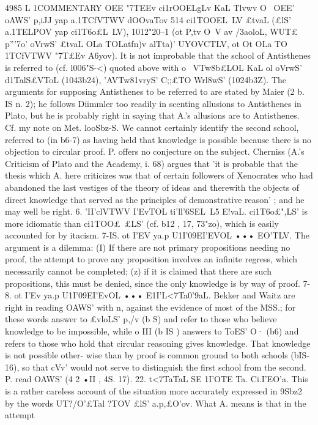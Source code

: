 {{4985
L 1COMMENTARY
OEE {"7TEEv ci1rOOELgLv KaL Tlvwv O~ OEE' oAWS' p,iJJ yap a.1TCfVTWV dOOvaTov
514
ci1TOOEL~LV £tvaL (£lS' a.1TELPOV yap
ci1T6o£L~LV), 1012"20--1 (ot P,tv O~V
av /3aol{oL, WUT£ p'''7o' oVrwS' £tvaL
OLa TOLatfn)v alTta)' UYOVCTLV, ot Ot
OLa TO 1TCfVTWV {"7T£Ev A6yov). It is not improbable that the school
of Antisthenes is referred to (cf. l006"S-<) quoted above with
o{ ~VTw8b£LOL KaL ol oVrwS' d1TalS£VToL (1043b24), 'AVTw81vryS' C;;£TO
Wrl8wS' (1024b3Z). The arguments for supposing Antisthenes to be
referred to are stated by Maier (2 b. IS n. 2); he follows Diimmler
too readily in scenting allusions to Antisthenes in Plato, but he
is probably right in saying that A.'s allusions are to Antisthenes.
Cf. my note on Met. looSbz-S.
We cannot certainly identify the second school, referred to (in
b6-7) as having held that knowledge is possible because there
is no objection to circular proof. P. offers no conjecture on the
subject. Cherniss (A.'s Criticism of Plato and the Academy,
i. 68) argues that 'it is probable that the thesis which A. here
criticizes was that of certain followers of Xenocrates who had
abandoned the last vestiges of the theory of ideas and therewith
the objects of direct knowledge that served as the principles of
demonstrative reason' ; and he may well be right.
6. 'II'clVTWV I'EvTOL ti'll'6SEL~L5 E!vaL. ci1T6o£",LS' is more idiomatic
than ci1TOO£~£LS' (cf. b12 , 17, 73"zo), which is easily accounted for
by itacism.
7-IS. ot I'EV ya.p U1I'09EI'EVOL ••• EO'TLV. The argument is a
dilemma: (I) If there are not primary propositions needing no
proof, the attempt to prove any proposition involves an infinite
regress, which necessarily cannot be completed; (z) if it is claimed
that there are such propositions, this must be denied, since the
only knowledge is by way of proof.
7-8. ot I'Ev ya.p U1I'09EI'EvOL ••• E1I'L<7Ta0'9aL. Bekker and Waitz
are right in reading OAWS' with n, against the evidence of most of
the MSS.; for these words answer to £vloLS' p,/v (b S) and refer to
those who believe knowledge to be impossible, while o{ III (b IS )
answers to ToES' O· (b6) and refers to those who hold that circular
reasoning gives knowledge. That knowledge is not possible other-
wise than by proof is common ground to both schools (bIS-16),
so that cVv\wS' would not serve to distinguish the first school from
the second. P. read OAWS' (4 2 •II , 4S. 17).
22. t<7TaTaL SE 1I'OTE Ta. Ci.I'EO'a. This is a rather careless account
of the situation more accurately expressed in 9Sbz2 by the words
UT?/O'£Tal ?TOV £lS' a.p,£O'ov. What A. means is that in the attempt
}}}}}}}
